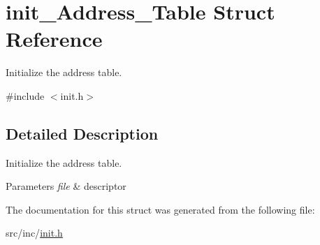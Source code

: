 \hypertarget{structinit___address___table}{}\section{init\+\_\+\+Address\+\_\+\+Table Struct Reference}
\label{structinit___address___table}


Initialize the address table.  




{\ttfamily \#include $<$init.\+h$>$}



\subsection{Detailed Description}
Initialize the address table. 


\begin{DoxyParams}{Parameters}
{\em file} & descriptor \\
\hline
\end{DoxyParams}


The documentation for this struct was generated from the following file\+:\begin{DoxyCompactItemize}
\item 
src/inc/\mbox{\hyperlink{init_8h}{init.\+h}}\end{DoxyCompactItemize}
